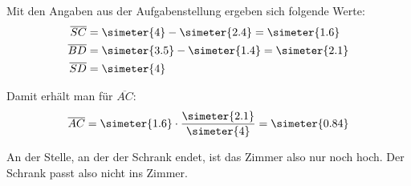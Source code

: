 \begin{exercise}
    Mit den Angaben aus der Aufgabenstellung ergeben sich folgende Werte:
    \begin{equation*}
      \begin{split}
        \overline{SC}&=\simeter{4}-\simeter{2.4}=\simeter{1.6} \\
        \overline{BD}&=\simeter{3.5}-\simeter{1.4}=\simeter{2.1} \\
        \overline{SD}&=\simeter{4}
      \end{split}
    \end{equation*}

    Damit erhält man für $\overline{AC}$:
    \begin{equation*}
      \overline{AC}=\simeter{1.6}\cdot\frac{\simeter{2.1}}{\simeter{4}}
                   =\simeter{0.84}
    \end{equation*}

    An der Stelle, an der der Schrank endet, ist das Zimmer also nur
    noch  hoch. Der Schrank passt also nicht ins Zimmer.
  \fi
\end{exercise}
